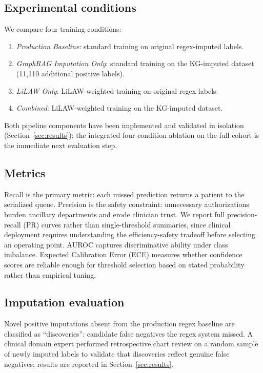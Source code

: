 \subsection{Experimental conditions}

We compare four training conditions:
\begin{enumerate}
    \item \textit{Production Baseline}: standard training on original regex-imputed labels.
    \item \textit{GraphRAG Imputation Only}: standard training on the KG-imputed dataset (11,110 additional positive labels).
    \item \textit{LiLAW Only}: LiLAW-weighted training on original regex labels.
    \item \textit{Combined}: LiLAW-weighted training on the KG-imputed dataset.
\end{enumerate}

Both pipeline components have been implemented and validated in isolation (Section~\ref{sec:results}); the integrated four-condition ablation on the full cohort is the immediate next evaluation step.

\subsection{Metrics}

Recall is the primary metric: each missed prediction returns a patient to the serialized queue. Precision is the safety constraint: unnecessary authorizations burden ancillary departments and erode clinician trust. We report full precision-recall (PR) curves rather than single-threshold summaries, since clinical deployment requires understanding the efficiency-safety tradeoff before selecting an operating point. AUROC captures discriminative ability under class imbalance. Expected Calibration Error (ECE) measures whether confidence scores are reliable enough for threshold selection based on stated probability rather than empirical tuning.

\subsection{Imputation evaluation}

Novel positive imputations absent from the production regex baseline are classified as ``discoveries'': candidate false negatives the regex system missed. A clinical domain expert performed retrospective chart review on a random sample of newly imputed labels to validate that discoveries reflect genuine false negatives; results are reported in Section~\ref{sec:results}.
